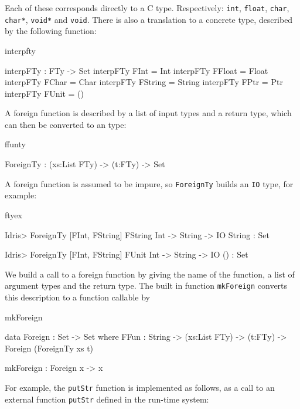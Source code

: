 \noindent
Each of these corresponds directly to a C type. Respectively: \texttt{int},
\texttt{float}, \texttt{char}, \texttt{char*}, \texttt{void*} and \texttt{void}.
There is also a translation to a concrete \Idris{} type, described by the
following function:

\begin{SaveVerbatim}{interpfty}

interpFTy : FTy -> Set
interpFTy FInt    = Int
interpFTy FFloat  = Float
interpFTy FChar   = Char
interpFTy FString = String
interpFTy FPtr    = Ptr
interpFTy FUnit   = ()

\end{SaveVerbatim}

\noindent
A foreign function is described by a list of input types and a return type, which
can then be converted to an \Idris{} type:

\begin{SaveVerbatim}{ffunty}

ForeignTy : (xs:List FTy) -> (t:FTy) -> Set

\end{SaveVerbatim}

\noindent
A foreign function is assumed to be impure, so \texttt{ForeignTy} builds an
\texttt{IO} type, for example:

\begin{SaveVerbatim}{ftyex}

Idris> ForeignTy [FInt, FString] FString
Int -> String -> IO String : Set

Idris> ForeignTy [FInt, FString] FUnit 
Int -> String -> IO () : Set

\end{SaveVerbatim}

\noindent
We build a call to a foreign function by giving the name of the function, a list of
argument types and the return type. The built in function \texttt{mkForeign}
converts this description to a function callable by \Idris{}

\begin{SaveVerbatim}{mkForeign}

data Foreign : Set -> Set where
    FFun : String -> (xs:List FTy) -> (t:FTy) -> 
           Foreign (ForeignTy xs t)

mkForeign : Foreign x -> x

\end{SaveVerbatim}

\noindent
For example, the \texttt{putStr} function is implemented as follows, as a call to 
an external function \texttt{putStr} defined in the run-time system:


